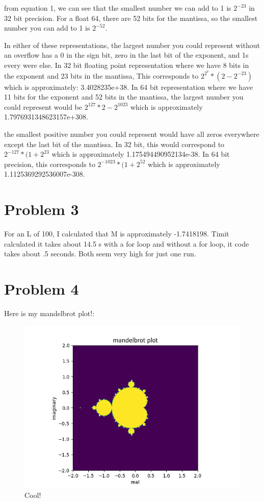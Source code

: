 \documentclass[11pt]{article}
\begin{document}
from equation 1, we can see that the smallest number we can add to 1 is $2^{-23}$ in 32 bit precision. For a float 64, there are 52 bits for the mantissa, so the  smallest number you can add to 1 is $2^{-52}$.
\par
In either of these representations, the largest number you could represent without an overflow has a 0 in the sign bit, zero in the last bit of the exponent, and 1s every were else. In 32 bit floating point representation where we have 8 bits in the exponent and 23 bits in the mantissa,  This corresponds to $2^{2^7}*(2-2^{-23})$ which is approximately: 3.4028235e+38. In 64 bit representation where we have 11 bits for the exponent and 52 bits in the mantissa, the largest number you could represent would be $2^{127}*{2-2^{1023}}$ which is approximately 1.7976931348623157e+308. 
\par
the smallest positive number you could represent would have all zeros everywhere except the last bit of the mantissa. In 32 bit, this would correspond to $2^{-127}*(1+2^{23}$ which is approximately 1.175494490952134e-38. In 64 bit precision, this corresponds to $2^{-1023}*(1+2^{52}$ which is approximately 1.1125369292536007e-308.

\section{Problem 3}
For an L of 100, I calculated that M is approximately -1.7418198. Timit calculated it takes about 14.5 s with a for loop and without a for loop, it code takes about .5 seconds. Both seem very high for just one run.

\section{Problem 4}

Here is my mandelbrot plot!:

\begin{figure}[h!]
    \centering
    \includegraphics[width=0.5\linewidth]{mandelbrotPlot.png}
    \caption{Cool!}
    \label{fig:enter-label}
\end{figure}
\end{document}
